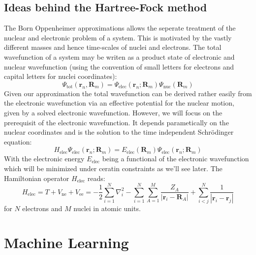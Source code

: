 \subsection{Ideas behind the Hartree-Fock method}
\label{subsec:background_hf}
The Born Oppenheimer approximations allows the seperate treatment of the nuclear and electronic problem of a system. This is motivated by the vastly different masses and hence time-scales of nuclei and electrons. The total wavefunction of a system may be writen as a product state of electronic and nuclear wavefunction (using the convention of small letters for electrons and capital letters for nuclei coordinates):
\begin{equation}
    \Psi_{\text{tot}}(\mathbf{r}_n, \mathbf{R}_m) = \Psi_{\text{elec}}(\mathbf{r}_n; \mathbf{R}_m) \Psi_{\text{nuc}}(\mathbf{R}_m)
\end{equation}
Given our approximation the total wavefunction can be derived rather easily from the electronic wavefunction via an effective potential for the nuclear motion, given by a solved electronic wavefunction. However, we will focus on the prerequisit of the electronic wavefunction. It depends parametically on the nuclear coordinates and is the solution to the time independent Schrödinger equation:
\begin{equation}
    H_\text{elec} \Psi_{\text{elec}}(\mathbf{r}_n; \mathbf{R}_m) = E_{\text{elec}}(\mathbf{R}_m) \Psi_{\text{elec}}(\mathbf{r}_n; \mathbf{R}_m)
\end{equation}
With the electronic energy $E_{\text{elec}}$ being a functional of the electronic wavefunction which will be minimized under ceratin constraints as we'll see later. 
The Hamiltonian operator $H_\text{elec}$ reads: 
\begin{equation}
    H_\text{elec} = T + V_{\text{ne}} + V_{\text{ee}} = -\frac{1}{2} \sum_{i=1}^N \nabla_i^2 - \sum_{i=1}^N \sum_{A=1}^M \frac{Z_A}{|\mathbf{r}_i - \mathbf{R}_A|} + \sum_{i<j}^N \frac{1}{|\mathbf{r}_i - \mathbf{r}_j|}
\end{equation}
for $N$ electrons and $M$ nuclei in atomic units. 

\section{Machine Learning}
\label{sec:background_ml}
